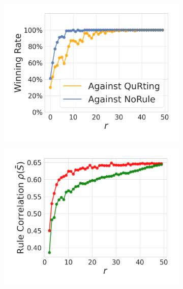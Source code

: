 \documentclass{article}
\begin{document}
\begin{figure}[h]
\centering
\begin{subfigure}{0.3\textwidth}
  \centering
  \includegraphics[width=1.0\linewidth]{figures/EvalA_IMDB_Pairwise_winning_rate.pdf}
  \caption{}
  \label{fig:EvalA_IMDB_Pairwise_winning_rate}
\end{subfigure}
\begin{subfigure}{0.297\textwidth}
  \centering
  \includegraphics[width=1.0\linewidth]{figures/EvalA_IMDB_Pairwise_dpp_vs_random_RC.pdf}
  \caption{}
  \label{fig:EvalA_IMDB_Pairwise_dpp_vs_random_RC}
\end{subfigure}
\begin{subfigure}{0.3\textwidth}

\end{subfigure}
\end{figure}
\end{document}
